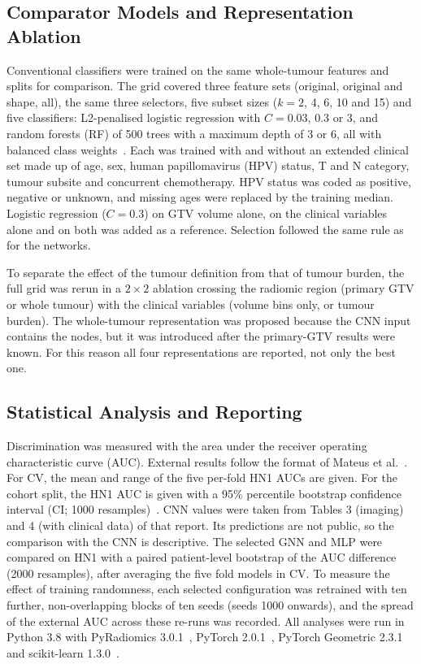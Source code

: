 \documentclass[pdflatex,iicol,sn-nature]{sn-jnl}
\begin{document}
\subsection{Comparator Models and Representation Ablation}\label{sec:cls}
Conventional classifiers were trained on the same whole-tumour features and splits for comparison. The grid covered three feature sets (original, original and shape, all), the same three selectors, five subset sizes ($k=2$, 4, 6, 10 and 15) and five classifiers: L2-penalised logistic regression with $C=0.03$, 0.3 or 3, and random forests (RF) of 500 trees with a maximum depth of 3 or 6, all with balanced class weights~\cite{pedregosa2011sklearn,breiman2001rf}. Each was trained with and without an extended clinical set made up of age, sex, human papillomavirus (HPV) status, T and N category, tumour subsite and concurrent chemotherapy. HPV status was coded as positive, negative or unknown, and missing ages were replaced by the training median. Logistic regression ($C=0.3$) on GTV volume alone, on the clinical variables alone and on both was added as a reference. Selection followed the same rule as for the networks.

To separate the effect of the tumour definition from that of tumour burden, the full grid was rerun in a $2\times2$ ablation crossing the radiomic region (primary GTV or whole tumour) with the clinical variables (volume bins only, or tumour burden). The whole-tumour representation was proposed because the CNN input contains the nodes, but it was introduced after the primary-GTV results were known. For this reason all four representations are reported, not only the best one.

\subsection{Statistical Analysis and Reporting}\label{sec:stats}
Discrimination was measured with the area under the receiver operating characteristic curve (AUC). External results follow the format of Mateus et al.~\cite{mateus2023}. For CV, the mean and range of the five per-fold HN1 AUCs are given. For the cohort split, the HN1 AUC is given with a 95\% percentile bootstrap confidence interval (CI; 1000 resamples)~\cite{efron1993}. CNN values were taken from Tables 3 (imaging) and 4 (with clinical data) of that report. Its predictions are not public, so the comparison with the CNN is descriptive. The selected GNN and MLP were compared on HN1 with a paired patient-level bootstrap of the AUC difference (2000 resamples), after averaging the five fold models in CV. To measure the effect of training randomness, each selected configuration was retrained with ten further, non-overlapping blocks of ten seeds (seeds 1000 onwards), and the spread of the external AUC across these re-runs was recorded. All analyses were run in Python 3.8 with PyRadiomics 3.0.1~\cite{vangriethuysen2017}, PyTorch 2.0.1~\cite{paszke2019pytorch}, PyTorch Geometric 2.3.1~\cite{fey2019pyg} and scikit-learn 1.3.0~\cite{pedregosa2011sklearn}.
\end{document}
